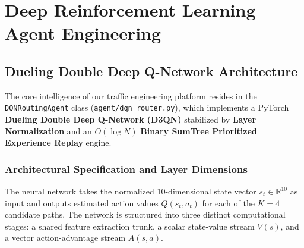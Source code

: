 \documentclass[12pt,a4paper,oneside]{report}
\begin{document}

\chapter{Deep Reinforcement Learning Agent Engineering}
\label{chap:agent}

\section{Dueling Double Deep Q-Network Architecture}
The core intelligence of our traffic engineering platform resides in the \texttt{DQNRoutingAgent} class (\texttt{agent/dqn\_router.py}), which implements a PyTorch \textbf{Dueling Double Deep Q-Network (D3QN)} stabilized by \textbf{Layer Normalization} and an $O(\log N)$ \textbf{Binary SumTree Prioritized Experience Replay} engine.

\subsection{Architectural Specification and Layer Dimensions}
The neural network takes the normalized 10-dimensional state vector $s_t \in \mathbb{R}^{10}$ as input and outputs estimated action values $Q(s_t, a_t)$ for each of the $K=4$ candidate paths. The network is structured into three distinct computational stages: a shared feature extraction trunk, a scalar state-value stream $V(s)$, and a vector action-advantage stream $A(s, a)$.
\end{document}

